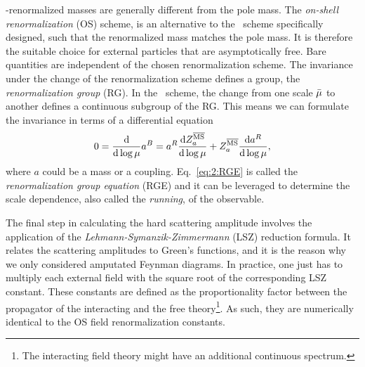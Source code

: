 \MS-renormalized masses are generally different from the pole mass. The \textit{on-shell renormalization} (\acs{OS}) scheme, is an alternative to the \MS\ scheme specifically designed, such that the renormalized mass matches the pole mass. It is therefore the suitable choice for external particles that are asymptotically free. Bare quantities are independent of the chosen renormalization scheme. The invariance under the change of the renormalization scheme defines a group, the \textit{renormalization group} (\acs{RG}). In the \MS\ scheme, the change from one scale $\bar{\mu}$ to another defines a continuous subgroup of the \acs{RG}. This means we can formulate the invariance in terms of a differential equation
\begin{equation}
0 = \frac{\mathrm{d}}{\mathrm{d} \log \mu} a^B  = a^R \frac{\mathrm{d} Z^{\overline{\mathrm{MS}}}_a}{\mathrm{d} \log \mu} + Z^{\overline{\mathrm{MS}}}_a \frac{\mathrm{d} a^R}{\mathrm{d} \log \mu},
\label{eq:2:RGE}
\end{equation}
where $a$ could be a mass or a coupling. Eq.~\eqref{eq:2:RGE} is called the \textit{renormalization group equation} (\acs{RGE}) and it can be leveraged to determine the scale dependence, also called the \textit{running}, of the observable.

The final step in calculating the hard scattering amplitude involves the application of the \textit{Lehmann-Symanzik-Zimmermann} (LSZ) reduction formula. It relates the scattering amplitudes to Green's functions, and it is the reason why we only considered amputated Feynman diagrams. In practice, one just has to multiply each external field with the square root of the corresponding LSZ constant. These constants are defined as the proportionality factor between the propagator of the interacting and the free theory\footnote{The interacting field theory might have an additional continuous spectrum.}. As such, they are numerically identical to the \acs{OS} field renormalization constants.

